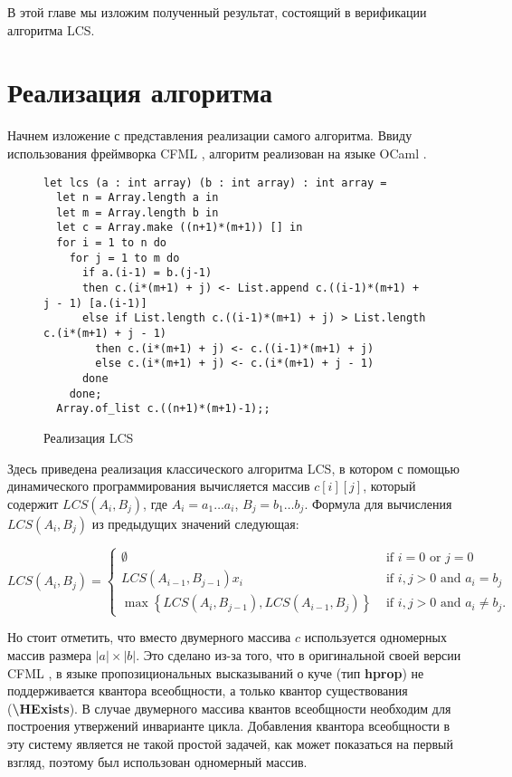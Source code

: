 В этой главе мы изложим полученный результат, состоящий в верификации алгоритма LCS.
\section{Реализация алгоритма}
Начнем изложение с представления реализации самого алгоритма. Ввиду использования фреймворка CFML \cite{base_article},
алгоритм реализован на языке OCaml \cite{ocaml}.

\begin{figure}[H]
  \caption{Реализация LCS}
  \label{code:lcs_impl}
  \begin{verbatim}
let lcs (a : int array) (b : int array) : int array =
  let n = Array.length a in
  let m = Array.length b in
  let c = Array.make ((n+1)*(m+1)) [] in
  for i = 1 to n do
    for j = 1 to m do
      if a.(i-1) = b.(j-1)
      then c.(i*(m+1) + j) <- List.append c.((i-1)*(m+1) + j - 1) [a.(i-1)]
      else if List.length c.((i-1)*(m+1) + j) > List.length c.(i*(m+1) + j - 1)
        then c.(i*(m+1) + j) <- c.((i-1)*(m+1) + j)
        else c.(i*(m+1) + j) <- c.(i*(m+1) + j - 1)
      done
    done; 
  Array.of_list c.((n+1)*(m+1)-1);;
\end{verbatim}
\end{figure}

Здесь приведена реализация классического алгоритма LCS, в котором с помощью динамического программирования вычисляется массив
$c[i][j]$, который содержит $LCS(A_i, B_j)$, где $A_i = a_1 \ldots a_i$, $B_j = b_1 \ldots b_j$.
Формула для вычисления $LCS(A_i, B_j)$ из предыдущих значений следующая:

$$
  L C S\left(A_{i}, B_{j}\right)=\left\{\begin{array}{ll}
    \emptyset                                                                              & \text { if } i=0 \text { or } j=0                    \\
    L C S\left(A_{i-1}, B_{j-1}\right) x_{i}                                               & \text { if } i, j>0 \text { and } a_{i}=b_{j}        \\
    \max \left\{L C S\left(A_{i}, B_{j-1}\right), L C S\left(A_{i-1}, B_{j}\right)\right\} & \text { if } i, j>0 \text { and } a_{i} \neq b_{j} .
  \end{array}\right.
$$

Но стоит отметить, что вместо двумерного массива $c$ используется одномерных массив размера $|a| \times |b|$. Это сделано из-за того,
что в оригинальной своей версии CFML \cite{base_article}, в языке пропозициональных высказываний о куче (тип \textbf{hprop})
не поддерживается квантора всеобщности, а только квантор существования (\textbf{\textbackslash HExists}). В случае двумерного массива
квантов всеобщности необходим для построения утвержений инварианте цикла.
Добавления квантора всеобщности в эту систему является не такой простой задачей, как может показаться на первый взгляд, поэтому
был использован одномерный массив.


